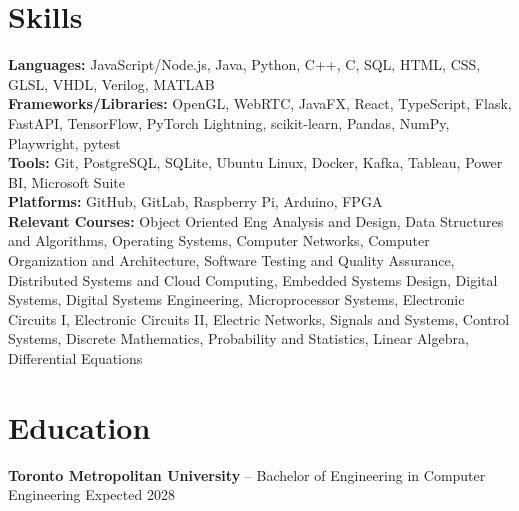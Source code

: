 \documentclass[11pt]{article}
\begin{document}

\section*{Skills}
\textbf{Languages:} JavaScript/Node.js, Java, Python, C++, C, SQL, HTML, CSS, GLSL, VHDL, Verilog, MATLAB \\
\textbf{Frameworks/Libraries:} OpenGL, WebRTC, JavaFX, React, TypeScript, Flask, FastAPI, TensorFlow, PyTorch Lightning, scikit-learn, Pandas, NumPy, Playwright, pytest \\
\textbf{Tools:} Git, PostgreSQL, SQLite, Ubuntu Linux, Docker, Kafka, Tableau, Power BI, Microsoft Suite \\
\textbf{Platforms:} GitHub, GitLab, Raspberry Pi, Arduino, FPGA \\
\textbf{Relevant Courses:} Object Oriented Eng Analysis and Design, Data Structures and Algorithms, Operating Systems, Computer Networks, Computer Organization and Architecture, Software Testing and Quality Assurance, Distributed Systems and Cloud Computing, Embedded Systems Design, Digital Systems, Digital Systems Engineering, Microprocessor Systems, Electronic Circuits I, Electronic Circuits II, Electric Networks, Signals and Systems, Control Systems, Discrete Mathematics, Probability and Statistics, Linear Algebra, Differential Equations

\section*{Education}
\textbf{Toronto Metropolitan University} -- Bachelor of Engineering in Computer Engineering \hfill Expected 2028
\end{document}
